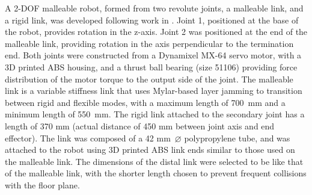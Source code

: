 A 2-DOF malleable robot, formed from two revolute joints, a malleable link, and a rigid link, was developed following work in \cite{clark2020design}. Joint 1, positioned at the base of the robot, provides rotation in the z-axis. Joint 2 was positioned at the end of the malleable link, providing rotation in the axis perpendicular to the termination end. Both joints were constructed from a Dynamixel MX-64 servo motor, with a 3D printed ABS housing, and a thrust ball bearing (size 51106) providing force distribution of the motor torque to the output side of the joint. The malleable link is a variable stiffness link that uses Mylar-based layer jamming to transition between rigid and flexible modes, with a maximum length of 700~mm and a minimum length of 550~mm. The rigid link attached to the secondary joint has a length of 370 mm (actual distance of 450 mm between joint axis and end effector). The link was composed of a 42 mm~$\diameter$ polypropylene tube, and was attached to the robot using 3D printed ABS link ends similar to those used on the malleable link. The dimensions of the distal link were selected to be like that of the malleable link, with the shorter length chosen to prevent frequent collisions with the floor plane.



